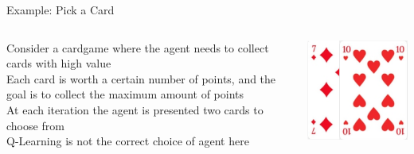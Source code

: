 \documentclass[aspectratio=169, 11pt, invertlogo]{ismll-slides}
\begin{document}

\begin{frame}[fragile]{Example: Pick a Card}
\begin{columns}
	\begin{column}{.6\linewidth}
		Consider a cardgame where the agent needs to collect cards with high value \\[1mm]
		Each card is worth a certain number of points, and the goal is to collect the maximum amount of points \\ [1mm]
		At each iteration the agent is presented two cards to choose from \\ [1mm]
		Q-Learning is not the correct choice of agent here
	\end{column}
	\begin{column}{.3\linewidth}
		\includegraphics[width=\linewidth]{pics/skat}
	\end{column}
\end{columns}
\end{frame}



\end{document}

